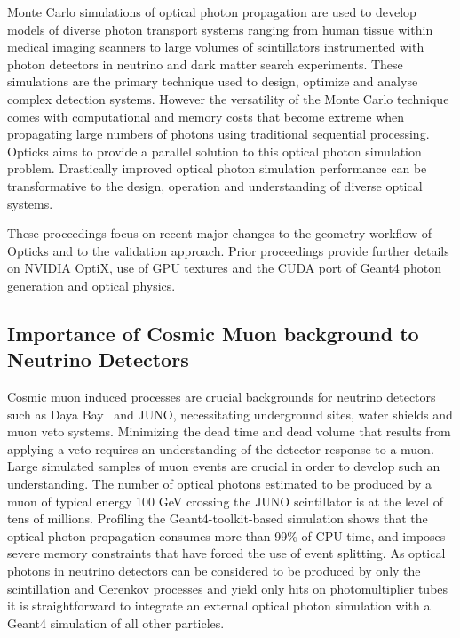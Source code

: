 \documentclass{webofc}
\begin{document}
Monte Carlo simulations of optical photon propagation 
are used to develop models of diverse photon transport systems 
ranging from human tissue within medical imaging scanners 
to large volumes of scintillators instrumented with photon detectors in neutrino 
and dark matter search experiments. 
These simulations are the primary technique used to design, optimize 
and analyse complex detection systems. However the versatility 
of the Monte Carlo technique comes with computational and memory costs 
that become extreme when propagating large numbers of photons
using traditional sequential processing. Opticks aims to provide a 
parallel solution to this optical photon simulation problem.  Drastically 
improved optical photon simulation performance can be transformative 
to the design, operation and understanding of diverse optical systems.

These proceedings focus on recent major changes to the geometry workflow of Opticks 
and to the validation approach. Prior proceedings\cite{chep2016} provide further
details on NVIDIA OptiX, use of GPU textures and the CUDA port of Geant4 photon generation 
and optical physics.
%
\subsection{Importance of Cosmic Muon background to Neutrino Detectors}
%
Cosmic muon induced processes are crucial backgrounds for neutrino
detectors such as Daya Bay~\cite{dyb} and JUNO\cite{juno},
necessitating underground sites, water shields and muon veto systems.
Minimizing the dead time and dead volume that results from applying
a veto requires an understanding of the detector response to a muon.
Large simulated samples of muon events are crucial in order to
develop such an understanding.
%
The number of optical photons estimated to be produced by a muon of
typical energy 100 GeV crossing the JUNO scintillator is at the level of tens of millions.
Profiling the Geant4-toolkit-based simulation shows that the optical photon propagation 
consumes more than 99\% of CPU time, and imposes severe memory constraints that have forced
the use of event splitting.  
%
As optical photons in neutrino detectors can be considered to be produced
by only the scintillation and Cerenkov processes and yield only hits
on photomultiplier tubes it is straightforward to integrate an
external optical photon simulation with a Geant4 simulation of all other particles.
%
\end{document}
